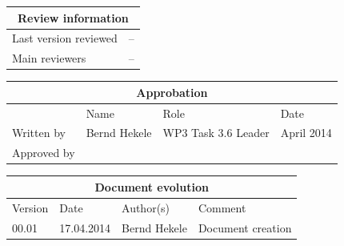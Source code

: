 \documentclass{template/openetcs_report}
\begin{document}
\begin{tabular}{|p{4.4cm}|p{8.7cm}|}
\hline
\multicolumn{2}{|c|}{Review information} \\
\hline
Last version reviewed & -- \\
\hline
Main reviewers & -- \\
\hline
\end{tabular}

\begin{tabular}{|p{2.2cm}|p{4cm}|p{4cm}|p{2cm}|}
\hline
\multicolumn{4}{|c|}{Approbation} \\
\hline
  &  Name & Role & Date   \\
\hline  
Written by    &  Bernd Hekele & WP3 Task 3.6 Leader  & April 2014\\
\hline
Approved by &  &  &  \\
\hline
\end{tabular}

\begin{tabular}{|p{1.5cm}|p{2cm}|p{3.5cm}|p{6cm}|}
\hline
\multicolumn{4}{|c|}{Document evolution} \\
\hline
Version &  Date & Author(s) & Comment  \\
\hline  
00.01 & 17.04.2014 & Bernd Hekele &  Document creation
\\\hline
\end{tabular}




\mainmatter
\end{document}
